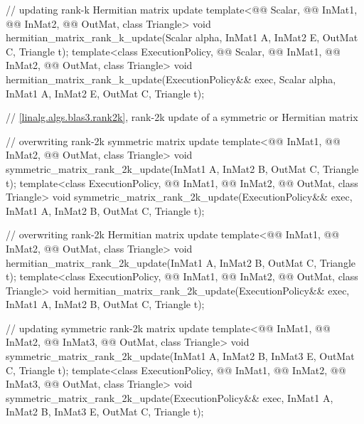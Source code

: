 \begin{codeblock}
{  // updating rank-k Hermitian matrix update
  template<@@ Scalar, @@ InMat1, @@ InMat2,
           @@ OutMat, class Triangle>
    void hermitian_matrix_rank_k_update(Scalar alpha, InMat1 A, InMat2 E, OutMat C, Triangle t);
  template<class ExecutionPolicy,
           @@ Scalar, @@ InMat1, @@ InMat2,
           @@ OutMat, class Triangle>
    void hermitian_matrix_rank_k_update(ExecutionPolicy&& exec, Scalar alpha,
                                        InMat1 A, InMat2 E, OutMat C, Triangle t);

  // \ref{linalg.algs.blas3.rank2k}, rank-2k update of a symmetric or Hermitian matrix

  // overwriting rank-2k symmetric matrix update
  template<@@ InMat1, @@ InMat2,
           @@ OutMat, class Triangle>
    void symmetric_matrix_rank_2k_update(InMat1 A, InMat2 B, OutMat C, Triangle t);
  template<class ExecutionPolicy,
           @@ InMat1, @@ InMat2,
           @@ OutMat, class Triangle>
    void symmetric_matrix_rank_2k_update(ExecutionPolicy&& exec,
                                         InMat1 A, InMat2 B, OutMat C, Triangle t);

  // overwriting rank-2k Hermitian matrix update
  template<@@ InMat1, @@ InMat2,
           @@ OutMat, class Triangle>
    void hermitian_matrix_rank_2k_update(InMat1 A, InMat2 B, OutMat C, Triangle t);
  template<class ExecutionPolicy,
           @@ InMat1, @@ InMat2,
           @@ OutMat, class Triangle>
    void hermitian_matrix_rank_2k_update(ExecutionPolicy&& exec,
                                         InMat1 A, InMat2 B, OutMat C, Triangle t);

  // updating symmetric rank-2k matrix update
  template<@@ InMat1, @@ InMat2, @@ InMat3,
           @@ OutMat, class Triangle>
    void symmetric_matrix_rank_2k_update(InMat1 A, InMat2 B, InMat3 E, OutMat C, Triangle t);
  template<class ExecutionPolicy,
           @@ InMat1, @@ InMat2, @@ InMat3,
           @@ OutMat, class Triangle>
    void symmetric_matrix_rank_2k_update(ExecutionPolicy&& exec,
                                         InMat1 A, InMat2 B, InMat3 E, OutMat C, Triangle t);

}
\end{codeblock}
